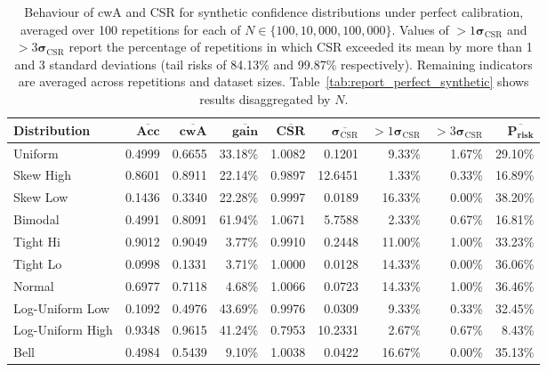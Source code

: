 \documentclass{article}
\theoremstyle{plain}
\theoremstyle{definition}
\theoremstyle{remark}
\begin{document}
\begin{table}[ht]
\centering
\footnotesize
\begin{tabular}{lrrrrrrrr}
\toprule
\textbf{Distribution} & $\overline{\textbf{Acc}}$ & $\overline{\textbf{cwA}}$ & $\overline{\textbf{gain}}$ & $\overline{\textbf{CSR}}$ & $\overline{\boldsymbol{\sigma}_{\mathrm{CSR}}}$ & $>1\boldsymbol{\sigma}_{\mathrm{CSR}}$ & $>3\boldsymbol{\sigma}_{\mathrm{CSR}}$ & $\overline{\textbf{P}_{\textbf{risk}}}$ \\
\midrule
Uniform & 0.4999 & 0.6655 & 33.18\% & 1.0082 & 0.1201 & 9.33\% & 1.67\% & 29.10\% \\
Skew High & 0.8601 & 0.8911 & 22.14\% & 0.9897 & 12.6451 & 1.33\% & 0.33\% & 16.89\% \\
Skew Low & 0.1436 & 0.3340 & 22.28\% & 0.9997 & 0.0189 & 16.33\% & 0.00\% & 38.20\% \\
Bimodal & 0.4991 & 0.8091 & 61.94\% & 1.0671 & 5.7588 & 2.33\% & 0.67\% & 16.81\% \\
Tight Hi & 0.9012 & 0.9049 & 3.77\% & 0.9910 & 0.2448 & 11.00\% & 1.00\% & 33.23\% \\
Tight Lo & 0.0998 & 0.1331 & 3.71\% & 1.0000 & 0.0128 & 14.33\% & 0.00\% & 36.06\% \\
Normal & 0.6977 & 0.7118 & 4.68\% & 1.0066 & 0.0723 & 14.33\% & 1.00\% & 36.46\% \\
Log-Uniform Low & 0.1092 & 0.4976 & 43.69\% & 0.9976 & 0.0309 & 9.33\% & 0.33\% & 32.45\% \\
Log-Uniform High & 0.9348 & 0.9615 & 41.24\% & 0.7953 & 10.2331 & 2.67\% & 0.67\% & 8.43\% \\
Bell & 0.4984 & 0.5439 & 9.10\% & 1.0038 & 0.0422 & 16.67\% & 0.00\% & 35.13\% \\
\bottomrule
\end{tabular}
\caption{Behaviour of cwA and CSR for synthetic confidence distributions under perfect calibration, averaged over 100 repetitions for each of $N \in \{100, 10{,}000, 100{,}000\}$. Values of $>1\boldsymbol{\sigma}_{\mathrm{CSR}}$ and $>3\boldsymbol{\sigma}_{\mathrm{CSR}}$ report the percentage of repetitions in which CSR exceeded its mean by more than 1 and 3 standard deviations (tail risks of 84.13\% and 99.87\% respectively). Remaining indicators are averaged across repetitions and dataset sizes. Table~\ref{tab:report_perfect_synthetic} shows results disaggregated by $N$.}
\label{tab:report_perfect_synthetic_summary}
\end{table}
\end{document}
